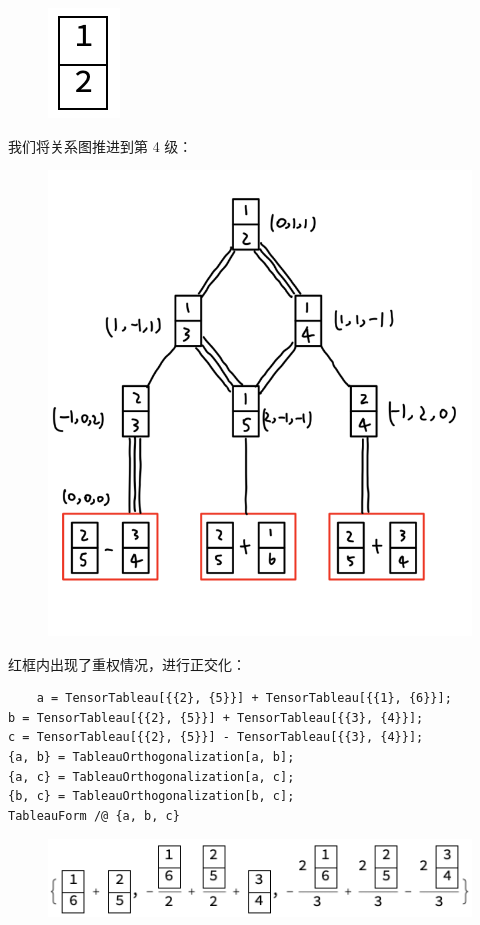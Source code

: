 \documentclass[UTF8]{ctexart}
\begin{document}
\begin{figure}[H]
\begin{centering}
\includegraphics[width=0.06\linewidth]{include/Y11}
\par\end{centering}
\end{figure}

\noindent 我们将关系图推进到第 4 级：

\begin{figure}[H]
\begin{centering}
\includegraphics[width=0.6\linewidth]{include/T8}
\par\end{centering}
\end{figure}

\noindent 红框内出现了重权情况，进行正交化：

\begin{verbatim}
	a = TensorTableau[{{2}, {5}}] + TensorTableau[{{1}, {6}}];
b = TensorTableau[{{2}, {5}}] + TensorTableau[{{3}, {4}}];
c = TensorTableau[{{2}, {5}}] - TensorTableau[{{3}, {4}}];
{a, b} = TableauOrthogonalization[a, b];
{a, c} = TableauOrthogonalization[a, c];
{b, c} = TableauOrthogonalization[b, c];
TableauForm /@ {a, b, c}
\end{verbatim}

\begin{figure}[H]
\begin{centering}
\includegraphics[width=0.8\linewidth]{include/O18}
\par\end{centering}
\end{figure}
\end{document}
